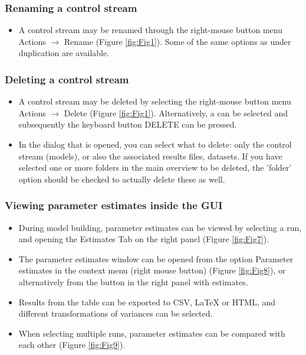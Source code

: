 \subsubsection*{Renaming a control stream}
\begin{itemize}
\item A control stream may be renamed through the right-mouse
  button menu Actions $\rightarrow$ Rename (Figure \ref{fig:Fig1}). Some of the
  same options as under duplication are available.
\end{itemize}

\subsubsection*{Deleting a control stream}
\begin{itemize}
\item A control stream may be deleted by selecting the right-mouse
  button menu Actions $\rightarrow$ Delete (Figure \ref{fig:Fig1}). Alternatively,
  a can be selected and subsequently the keyboard button DELETE can be
  pressed.
\item In the dialog that is opened, you can select what to delete:
  only the control stream (models), or also the associated results
  files, datasets. If you have selected one or more folders in the
  main overview to be deleted, the 'folder' option should be checked to
  actually delete these as well.
\end{itemize}

\subsubsection*{Viewing parameter estimates inside the GUI}

\begin{itemize}
\item During model building, parameter estimates can be viewed by selecting a run, and opening the Estimates Tab on the right panel (Figure \ref{fig:Fig7}).
\item The parameter estimates window can be opened from the option Parameter estimates in the context menu (right mouse button) (Figure \ref{fig:Fig8}), or alternatively from the button in the right panel with estimates. 
\item Results from the table can be exported to CSV, LaTeX or HTML, and different transformations of variances can be selected.
\item When selecting multiple runs, parameter estimates can be compared with each other (Figure \ref{fig:Fig9}). 
\end{itemize}

